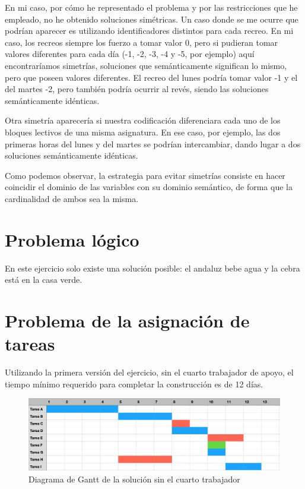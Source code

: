\documentclass[12pt]{article} %
\begin{document}
En mi caso, por cómo he representado el problema y por las restricciones que he empleado, no he obtenido soluciones simétricas. Un caso donde se me ocurre que podrían aparecer es utilizando identificadores distintos para cada recreo. En mi caso, los recreos siempre los fuerzo a tomar valor 0, pero si pudieran tomar valores diferentes para cada día (-1, -2, -3, -4 y -5, por ejemplo) aquí encontraríamos simetrías, soluciones que semánticamente significan lo mismo, pero que poseen valores diferentes. El recreo del lunes podría tomar valor -1 y el del martes -2, pero también podría ocurrir al revés, siendo las soluciones semánticamente idénticas.

Otra simetría aparecería si nuestra codificación diferenciara cada uno de los bloques lectivos de una misma asignatura. En ese caso, por ejemplo, las dos primeras horas del lunes y del martes se podrían intercambiar, dando lugar a dos soluciones semánticamente idénticas.

Como podemos observar, la estrategia para evitar simetrías consiste en hacer coincidir el dominio de las variables con su dominio semántico, de forma que la cardinalidad de ambos sea la misma.

\section{Problema lógico}
En este ejercicio solo existe una solución posible: el andaluz bebe agua y la cebra está en la casa verde.

\section{Problema de la asignación de tareas}
Utilizando la primera versión del ejercicio, sin el cuarto trabajador de apoyo, el tiempo mínimo requerido para completar la construcción es de 12 días.

\begin{figure}[H] %
    \centering
        \includegraphics[scale=0.32]{gantt.png}
        \caption{Diagrama de Gantt de la solución sin el cuarto trabajador}
\end{figure}
\end{document}
